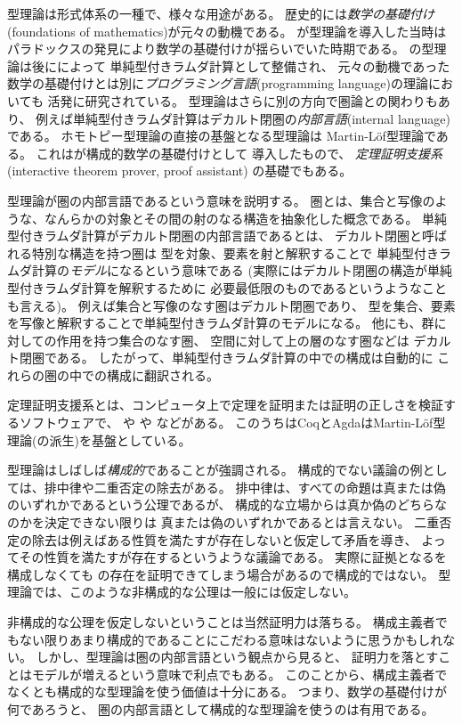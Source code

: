 \documentclass[index]{subfiles}
\begin{document}

型理論は形式体系の一種で、様々な用途がある。
歴史的には\emph{数学の基礎付け}(foundations of mathematics)が元々の動機である。
が型理論を導入した当時は
パラドックスの発見により数学の基礎付けが揺らいでいた時期である。
の型理論は後にによって
単純型付きラムダ計算として整備され、
元々の動機であった数学の基礎付けとは別に\emph{プログラミング言語}(programming language)の理論においても
活発に研究されている。
型理論はさらに別の方向で圏論との関わりもあり、
例えば単純型付きラムダ計算はデカルト閉圏の\emph{内部言語}(internal language)
である。
ホモトピー型理論の直接の基盤となる型理論は
Martin-Löf型理論である。
これはが構成的数学の基礎付けとして
導入したもので、
\emph{定理証明支援系}(interactive theorem prover, proof assistant)
の基礎でもある。

型理論が圏の内部言語であるという意味を説明する。
圏とは、集合と写像のような、なんらかの対象とその間の射のなる構造を抽象化した概念である。
単純型付きラムダ計算がデカルト閉圏の内部言語であるとは、
デカルト閉圏と呼ばれる特別な構造を持つ圏は
型を対象、要素を射と解釈することで
単純型付きラムダ計算の\emph{モデル}になるという意味である
(実際にはデカルト閉圏の構造が単純型付きラムダ計算を解釈するために
必要最低限のものであるというようなことも言える)。
例えば集合と写像のなす圏はデカルト閉圏であり、
型を集合、要素を写像と解釈することで単純型付きラムダ計算のモデルになる。
他にも、群に対しての作用を持つ集合のなす圏、
空間に対して上の層のなす圏などは
デカルト閉圏である。
したがって、単純型付きラムダ計算の中での構成は自動的に
これらの圏の中での構成に翻訳される。

定理証明支援系とは、コンピュータ上で定理を証明または証明の正しさを検証するソフトウェアで、
や
や
などがある。
このうちはCoqとAgdaはMartin-Löf型理論(の派生)を基盤としている。

型理論はしばしば\emph{構成的}であることが強調される。
構成的でない議論の例としては、排中律や二重否定の除去がある。
排中律は、すべての命題は真または偽のいずれかであるという公理であるが、
構成的な立場からは真か偽のどちらなのかを決定できない限りは
真または偽のいずれかであるとは言えない。
二重否定の除去は例えばある性質を満たすが存在しないと仮定して矛盾を導き、
よってその性質を満たすが存在するというような議論である。
実際に証拠となるを構成しなくても
の存在を証明できてしまう場合があるので構成的ではない。
型理論では、このような非構成的な公理は一般には仮定しない。

非構成的な公理を仮定しないということは当然証明力は落ちる。
構成主義者でもない限りあまり構成的であることにこだわる意味はないように思うかもしれない。
しかし、型理論は圏の内部言語という観点から見ると、
証明力を落とすことはモデルが増えるという意味で利点でもある。
このことから、構成主義者でなくとも構成的な型理論を使う価値は十分にある。
つまり、数学の基礎付けが何であろうと、
圏の内部言語として構成的な型理論を使うのは有用である。
\end{document}
